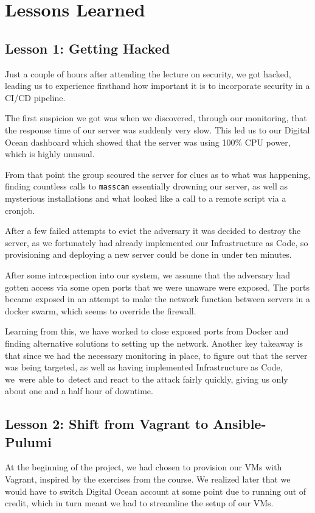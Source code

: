 \section{Lessons Learned}

\subsection{Lesson 1: Getting Hacked}
\label{section_hacked}
Just a couple of hours after attending the lecture on security, we got hacked, leading us to experience firsthand how important it is to incorporate security in a CI/CD pipeline.

The first suspicion we got was when we discovered, through our monitoring, that the response time of our server was suddenly very slow. This led us to our Digital Ocean dashboard which showed that the server was using 100\% CPU power, which is highly unusual.

From that point the group scoured the server for clues as to what was happening, finding countless calls to \texttt{masscan} essentially drowning our server, as well as mysterious installations and what looked like a call to a remote script via a cronjob.

After a few failed attempts to evict the adversary it was decided to destroy the server, as we fortunately had already implemented our Infrastructure as Code, so provisioning and deploying a new server could be done in under ten minutes.

After some introspection into our system, we assume that the adversary had gotten access via some open ports that we were unaware were exposed. The ports became exposed in an attempt to make the network function between servers in a docker swarm, which seems to override the firewall.

Learning from this, we have worked to close exposed ports from Docker and finding alternative solutions to setting up the network. Another key takeaway is that since we had the necessary monitoring in place, to figure out that the server was being targeted, as well as having implemented Infrastructure as Code, we were able to detect and react to the attack fairly quickly, giving us only about one and a half hour of downtime.

\subsection{Lesson 2: Shift from Vagrant to Ansible-Pulumi}
At the beginning of the project, we had chosen to provision our VMs with Vagrant, inspired by the exercises from the course.
We realized later that we would have to switch Digital Ocean account at some point due to running out of credit, which in turn meant we had to streamline the setup of our VMs.

